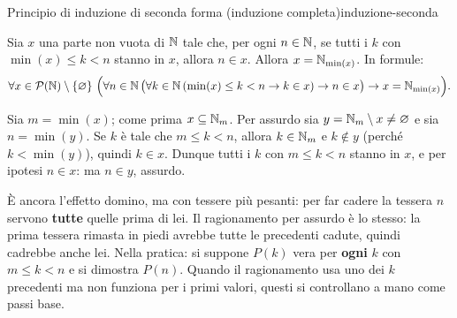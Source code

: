 \begin{concetto}
\begin{Teorema}{Principio di induzione di seconda forma (induzione completa)}{induzione-seconda}
    \begin{prerequisiti}
    \end{prerequisiti}
    Sia $x$ una parte non vuota di $\mathbb{N}$ tale che, per ogni $n \in \mathbb{N}$, se tutti i $k$ con $\min(x) \leq k < n$ stanno in $x$,
    allora $n \in x$. Allora $x = \mathbb{N}_{\min(x)}$. In formule:
    \[ \forall x \in \mathcal{P}(\mathbb{N}) \setminus \{\varnothing\}\ \Big(\forall n \in \mathbb{N}\,\big(\forall k \in \mathbb{N}\,(\min(x) \leq k < n \rightarrow k \in x) \rightarrow n \in x\big)
       \rightarrow x = \mathbb{N}_{\min(x)}\Big). \]
\end{Teorema}
\begin{dimostrazione}
    Sia $m = \min(x)$; come prima $x \subseteq \mathbb{N}_m$. Per assurdo sia $y = \mathbb{N}_m \setminus x \neq \varnothing$ e sia $n = \min(y)$.
    Se $k$ è tale che $m \leq k < n$, allora $k \in \mathbb{N}_m$ e $k \notin y$ (perché $k < \min(y)$), quindi $k \in x$. Dunque tutti i $k$
    con $m \leq k < n$ stanno in $x$, e per ipotesi $n \in x$: ma $n \in y$, assurdo.
\end{dimostrazione}
\end{concetto}

\begin{spiegazione}
    È ancora l'effetto domino, ma con tessere più pesanti: per far cadere la tessera $n$ servono \textbf{tutte} quelle prima di lei.
    Il ragionamento per assurdo è lo stesso: la prima tessera rimasta in piedi avrebbe tutte le precedenti cadute, quindi cadrebbe
    anche lei. Nella pratica: si suppone $P(k)$ vera per \textbf{ogni} $k$ con $m \leq k < n$ e si dimostra $P(n)$. Quando il ragionamento
    usa uno dei $k$ precedenti ma non funziona per i primi valori, questi si controllano a mano come passi base.
\end{spiegazione}

